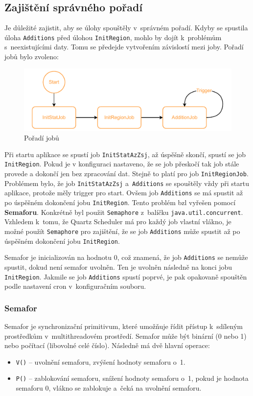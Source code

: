 \subsection{Zajištění správného pořadí}
Je důležité zajistit, aby se úlohy spouštěly v~správném pořadí.
Kdyby se spustila úloha \texttt{Additions} před úlohou \texttt{InitRegion}, 
mohlo by dojít k~problémům s~neexistujícími daty.
Tomu se předejde vytvořením závislostí mezi joby.
Pořadí jobů bylo zvoleno:
\begin{figure}[!h]
    \label{fig:jobs_scheduled}
    \caption{Pořadí jobů}
    \centering
    \includegraphics[width=\textwidth]{figures/jobs_scheduled.pdf}
\end{figure}

Při startu aplikace se spustí job \texttt{InitStatAzZsj}, až úspěšně skončí,
spustí se job \texttt{InitRegion}. Pokud je v konfiguraci nastaveno, že se job 
přeskočí tak job stále provede a dokončí jen bez zpracování dat.
Stejně to platí pro job \texttt{InitRegionJob}.
Problémem bylo, že job \texttt{InitStatAzZsj} a~\texttt{Additions} 
se spouštěly vždy při startu aplikace, protože měly trigger pro start. 
Ovšem job \texttt{Additions} se má spustit až po úspěšném dokončení jobu 
\texttt{InitRegion}. Tento problém bzl vyřešen pomocí \textbf{Semaforu}.
Konkrétně byl použit \texttt{Semaphore} z~balíčku \texttt{java.util.concurrent}.
Vzhledem k~tomu, že Quartz Scheduler má pro každý job vlastní vlákno,
je možné použít \texttt{Semaphore} pro zajištění, že se job \texttt{Additions}
může spustit až po úspěšném dokončení jobu \texttt{InitRegion}.

Semafor je inicializován na hodnotu 0, což znamená, že job \texttt{Additions}
se nemůže spustit, dokud není semafor uvolněn. Ten je uvolněn následně na konci 
jobu \texttt{InitRegion}. Jakmile se job \texttt{Additions} spustí poprvé, je pak 
opakovaně spouštěn podle nastavení cron v~konfiguračním souboru.

\subsubsection*{Semafor}
Semafor je synchronizační primitivum, které umožňuje řídit přístup 
k~sdíleným prostředkům v~multithreadovém prostředí.
Semafor může být binární (0 nebo 1) nebo počítací (libovolné celé číslo).
Následně má dvě hlavní operace:
\begin{itemize}
    \item \texttt{V()} -- uvolnění semaforu, zvýšení hodnoty semaforu o~1.
    \item \texttt{P()} -- zablokování semaforu, snížení hodnoty semaforu o~1, pokud je hodnota semaforu 0, vlákno se zablokuje a~čeká na uvolnění semaforu.
\end{itemize}

